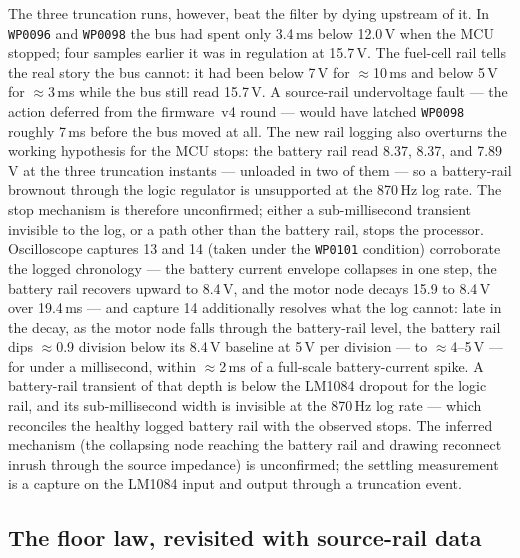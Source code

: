 \documentclass[11pt]{article}
\newcommand{\code}[1]{\texttt{#1}}
\begin{document}
The three truncation runs, however, beat the filter by dying upstream of it.
In \code{WP0096} and \code{WP0098} the bus had spent only 3.4\,ms below
12.0\,V when the MCU stopped; four samples earlier it was in regulation at
15.7\,V. The fuel-cell rail tells the real story the bus cannot: it had been
below 7\,V for $\approx$10\,ms and below 5\,V for $\approx$3\,ms while the bus
still read 15.7\,V. A source-rail undervoltage fault --- the action deferred
from the firmware~v4 round --- would have latched \code{WP0098} roughly 7\,ms
before the bus moved at all. The new rail logging also overturns the working
hypothesis for the MCU stops: the battery rail read 8.37, 8.37, and 7.89\,V
at the three truncation instants --- unloaded in two of them --- so a
battery-rail brownout through the logic regulator is unsupported at the
870\,Hz log rate. The stop mechanism is therefore unconfirmed; either a
sub-millisecond transient invisible to the log, or a path other than the
battery rail, stops the processor. Oscilloscope captures 13 and 14 (taken
under the \code{WP0101} condition) corroborate the logged chronology --- the
battery current envelope collapses in one step, the battery rail recovers
upward to 8.4\,V, and the motor node decays 15.9 to 8.4\,V over 19.4\,ms ---
and capture 14 additionally resolves what the log cannot: late in the decay,
as the motor node falls through the battery-rail level, the battery rail dips
$\approx$0.9 division below its 8.4\,V baseline at 5\,V per division ---
to $\approx$4--5\,V --- for under a millisecond, within $\approx$2\,ms of a
full-scale battery-current spike. A battery-rail transient of that depth is
below the LM1084 dropout for the logic rail, and its sub-millisecond width is
invisible at the 870\,Hz log rate --- which reconciles the healthy logged
battery rail with the observed stops. The inferred mechanism (the collapsing
node reaching the battery rail and drawing reconnect inrush through the source
impedance) is unconfirmed; the settling measurement is a capture on the LM1084
input and output through a truncation event.

\subsection{The floor law, revisited with source-rail data}
\label{sec:floorlaw}
\end{document}
